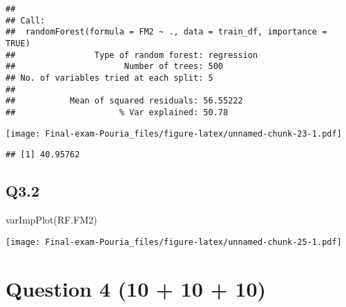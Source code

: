 \documentclass[
]{article}
\newenvironment{Shaded}{\begin{snugshade}}{\end{snugshade}}
\newcommand{\AttributeTok}[1]{\textcolor[rgb]{0.77,0.63,0.00}{#1}}
\newcommand{\DecValTok}[1]{\textcolor[rgb]{0.00,0.00,0.81}{#1}}
\newcommand{\FunctionTok}[1]{\textcolor[rgb]{0.00,0.00,0.00}{#1}}
\newcommand{\NormalTok}[1]{#1}
\newcommand{\OtherTok}[1]{\textcolor[rgb]{0.56,0.35,0.01}{#1}}
\newcommand{\SpecialCharTok}[1]{\textcolor[rgb]{0.00,0.00,0.00}{#1}}
\begin{document}
\begin{verbatim}
## 
## Call:
##  randomForest(formula = FM2 ~ ., data = train_df, importance = TRUE) 
##                Type of random forest: regression
##                      Number of trees: 500
## No. of variables tried at each split: 5
## 
##           Mean of squared residuals: 56.55222
##                     % Var explained: 50.78
\end{verbatim}

\begin{Shaded}
\end{Shaded}

\texttt{[image: Final-exam-Pouria\_files/figure-latex/unnamed-chunk-23-1.pdf]}

\begin{Shaded}
\end{Shaded}

\begin{verbatim}
## [1] 40.95762
\end{verbatim}

\hypertarget{q3.2}{%
\subsection{Q3.2}\label{q3.2}}

\begin{Shaded}
\begin{Highlighting}[]
\FunctionTok{varImpPlot}\NormalTok{(RF.FM2)}
\end{Highlighting}
\end{Shaded}

\texttt{[image: Final-exam-Pouria\_files/figure-latex/unnamed-chunk-25-1.pdf]}

\hypertarget{question-4-10-10-10}{%
\section{Question 4 (10 + 10 + 10)}\label{question-4-10-10-10}}
\end{document}
